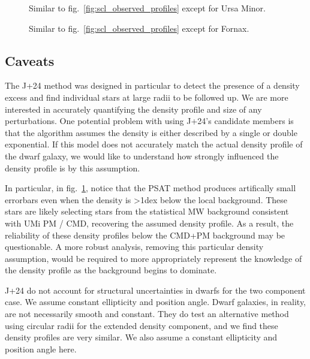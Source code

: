 \begin{figure}
\centering
{}
\caption[Ursa Minor density profiles]{Similar to
fig.~\ref{fig:scl_observed_profiles} except for Ursa
Minor.}\label{fig:umi_observed_profiles}
\end{figure}

\begin{figure}
\centering
{}
\caption[Fornax density profiles]{Similar to
fig.~\ref{fig:scl_observed_profiles} except for
Fornax.}\label{fig:fornax_observed_profiles}
\end{figure}

\subsection{Caveats}\label{caveats}

The J+24 method was designed in particular to detect the presence of a
density excess and find individual stars at large radii to be followed
up. We are more interested in accurately quantifying the density profile
and size of any perturbations. One potential problem with using J+24's
candidate members is that the algorithm assumes the density is either
described by a single or double exponential. If this model does not
accurately match the actual density profile of the dwarf galaxy, we
would like to understand how strongly influenced the density profile is
by this assumption.

In particular, in fig.~\ref{fig:umi_observed_profiles}, notice that the
PSAT method produces artifically small errorbars even when the density
is \textgreater1dex below the local background. These stars are likely
selecting stars from the statistical MW background consistent with UMi
PM / CMD, recovering the assumed density profile. As a result, the
reliability of these density profiles below the CMD+PM background may be
questionable. A more robust analysis, removing this particular density
assumption, would be required to more appropriately represent the
knowledge of the density profile as the background begins to dominate.

J+24 do not account for structural uncertainties in dwarfs for the two
component case. We assume constant ellipticity and position angle. Dwarf
galaxies, in reality, are not necessarily smooth and constant. They do
test an alternative method using circular radii for the extended density
component, and we find these density profiles are very similar. We also
assume a constant ellipticity and position angle here.

